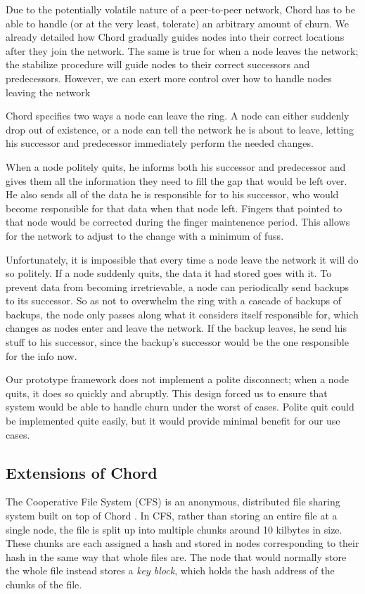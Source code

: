 \documentclass[conference, compsocconf, letterpaper]{IEEEtran}
\begin{document}
Due to the potentially volatile nature of a peer-to-peer network, Chord has to be able to handle (or at the very least, tolerate) an arbitrary amount of churn.  We already detailed how Chord gradually guides nodes into their correct locations after they join the network.  The same is true for when a node leaves the network; the stabilize procedure will guide nodes to their correct successors and predecessors.  However, we can exert more control over how to handle nodes leaving the network

Chord specifies two ways a node can leave the ring.  A node can either suddenly drop out of existence, or a node can tell the network he is about to leave, letting his successor and predecessor immediately perform the needed changes.

When a node politely quits, he informs both his successor and predecessor and gives them all the information they need to fill the gap that would be left over. He also sends all of the data he is responsible for to his successor, who would become responsible for that data when that node left.  Fingers that pointed to that node would be corrected during the finger maintenence period.  This allows for the network to adjust to the change with a minimum of fuss.

Unfortunately, it is impossible that every time a node leave the network it will do so politely.  If a node suddenly quits, the data it had stored goes with it. To prevent data from becoming irretrievable, a node can periodically send backups to its successor.  So as not to overwhelm the ring with a cascade of backups of backups, the node only passes along what it considers itself responsible for, which changes as nodes enter and leave the network.  If the backup leaves, he send his stuff to his successor, since the backup's successor would be the one responsible for the info now. 

Our prototype framework does not implement a polite disconnect;  when a node quits, it does so quickly and abruptly.  This design forced us to ensure that system would be able to handle churn under the worst of cases.  Polite quit could be implemented quite easily, but it would provide minimal benefit for our use cases. 


\subsection{Extensions of Chord}

The Cooperative File System (CFS) is an anonymous, distributed file sharing system built on top of Chord \cite{CFS}.  In CFS, rather than storing an entire file at a single node, the file is split up into multiple chunks around 10 kilbytes in size.  These chunks are each assigned a hash and stored in nodes corresponding to their hash in the same way that whole files are.  The node that would normally store the whole file instead stores a \emph{key block}, which holds the hash address of the chunks of the file. 
\end{document}
